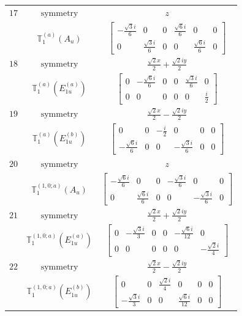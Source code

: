 \documentclass[fleqn,8pt,landscape]{jsarticle}
\begin{document}
\begin{longtable}{ccc}
$ 17 $ & $ \text{symmetry} $ & $ z $ \\
$  $ & $ \mathbb{T}_{1}^{(a)}(A_{u}) $ & $ \begin{bmatrix} - \frac{\sqrt{3} i}{6} & 0 & 0 & \frac{\sqrt{6} i}{6} & 0 & 0 \\ 0 & \frac{\sqrt{3} i}{6} & 0 & 0 & \frac{\sqrt{6} i}{6} & 0 \end{bmatrix} $ \\ \hline
$ 18 $ & $ \text{symmetry} $ & $ \frac{\sqrt{2} x}{2} + \frac{\sqrt{2} i y}{2} $ \\
$  $ & $ \mathbb{T}_{1}^{(a)}(E_{1u}^{(a)}) $ & $ \begin{bmatrix} 0 & - \frac{\sqrt{6} i}{6} & 0 & 0 & \frac{\sqrt{3} i}{6} & 0 \\ 0 & 0 & 0 & 0 & 0 & \frac{i}{2} \end{bmatrix} $ \\ \hline
$ 19 $ & $ \text{symmetry} $ & $ \frac{\sqrt{2} x}{2} - \frac{\sqrt{2} i y}{2} $ \\
$  $ & $ \mathbb{T}_{1}^{(a)}(E_{1u}^{(b)}) $ & $ \begin{bmatrix} 0 & 0 & - \frac{i}{2} & 0 & 0 & 0 \\ - \frac{\sqrt{6} i}{6} & 0 & 0 & - \frac{\sqrt{3} i}{6} & 0 & 0 \end{bmatrix} $ \\ \hline
$ 20 $ & $ \text{symmetry} $ & $ z $ \\
$  $ & $ \mathbb{T}_{1}^{(1,0;a)}(A_{u}) $ & $ \begin{bmatrix} - \frac{\sqrt{6} i}{6} & 0 & 0 & - \frac{\sqrt{3} i}{6} & 0 & 0 \\ 0 & \frac{\sqrt{6} i}{6} & 0 & 0 & - \frac{\sqrt{3} i}{6} & 0 \end{bmatrix} $ \\ \hline
$ 21 $ & $ \text{symmetry} $ & $ \frac{\sqrt{2} x}{2} + \frac{\sqrt{2} i y}{2} $ \\
$  $ & $ \mathbb{T}_{1}^{(1,0;a)}(E_{1u}^{(a)}) $ & $ \begin{bmatrix} 0 & - \frac{\sqrt{3} i}{3} & 0 & 0 & - \frac{\sqrt{6} i}{12} & 0 \\ 0 & 0 & 0 & 0 & 0 & - \frac{\sqrt{2} i}{4} \end{bmatrix} $ \\ \hline
$ 22 $ & $ \text{symmetry} $ & $ \frac{\sqrt{2} x}{2} - \frac{\sqrt{2} i y}{2} $ \\
$  $ & $ \mathbb{T}_{1}^{(1,0;a)}(E_{1u}^{(b)}) $ & $ \begin{bmatrix} 0 & 0 & \frac{\sqrt{2} i}{4} & 0 & 0 & 0 \\ - \frac{\sqrt{3} i}{3} & 0 & 0 & \frac{\sqrt{6} i}{12} & 0 & 0 \end{bmatrix} $ \\ \hline

\end{longtable}
\end{document}
